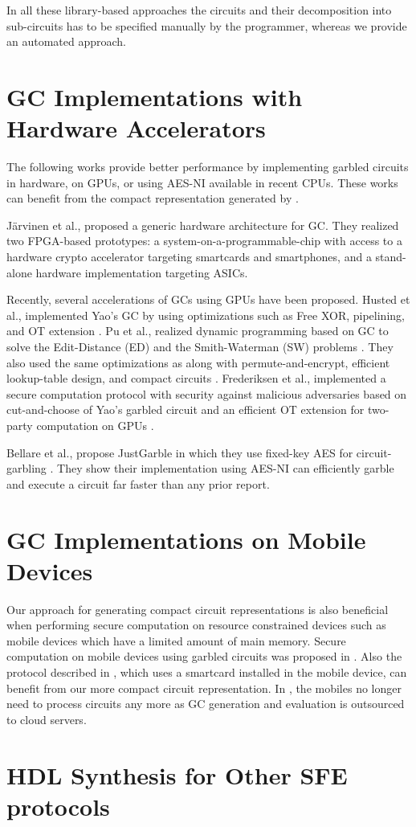 In all these library-based approaches the circuits and their decomposition into sub-circuits has to be specified manually by the programmer, whereas we provide an automated approach.

\section{GC Implementations with Hardware Accelerators}
The following works provide better performance by implementing garbled circuits in hardware, on GPUs, or using AES-NI available in recent CPUs.
These works can benefit from the compact representation generated by \sys.

J\"arvinen et al., \cite{jarvinen2010garbled} proposed a generic hardware architecture for GC.
They realized two FPGA-based prototypes: a system-on-a-programmable-chip with access to a hardware crypto accelerator targeting smartcards and smartphones, and a stand-alone hardware implementation targeting ASICs.

Recently, several accelerations of GCs using GPUs have been proposed.
Husted et al., implemented Yao's GC by using optimizations such as Free XOR, pipelining, and OT extension \cite{husted2013gpu}.
Pu et al., realized dynamic programming based on GC to solve the Edit-Distance (ED) and the Smith-Waterman (SW) problems \cite{pu2013computing}.
They also used the same optimizations as \cite{husted2013gpu} along with permute-and-encrypt, efficient lookup-table design, and compact circuits \cite{pu2013computing}.
Frederiksen et al., implemented a secure computation protocol with security against malicious adversaries based on cut-and-choose of Yao's garbled circuit and an efficient OT extension for two-party computation on GPUs \cite{frederiksen2013fast}.

Bellare et al., propose JustGarble in which they use fixed-key AES for circuit-garbling \cite{bellare2013efficient}.
They show their implementation using AES-NI can efficiently garble and execute a circuit far faster than any prior report.

\section{GC Implementations on Mobile Devices}
Our approach for generating compact circuit representations is also beneficial when performing secure computation on resource constrained devices such as mobile devices which have a limited amount of main memory.
Secure computation on mobile devices using garbled circuits was proposed in \cite{huang2011privacy}.
Also the protocol described in \cite{demmler2014ad}, which uses a smartcard installed in the mobile device, can benefit from our more compact circuit representation.
In \cite{carter2016secure, carter2014whitewash}, the mobiles no longer need to process circuits any more as GC generation and evaluation is outsourced to cloud servers.

\section{HDL Synthesis for Other SFE protocols}
